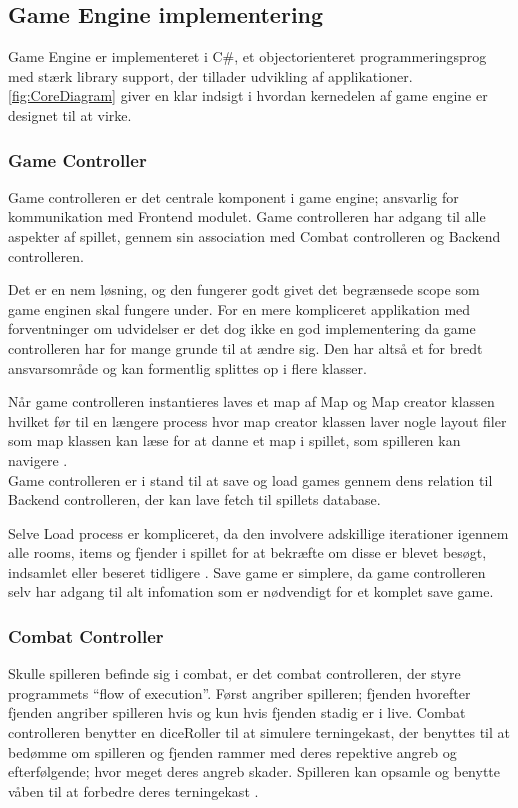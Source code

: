 \subsection{Game Engine implementering}
Game Engine er implementeret i C\#, et objectorienteret programmeringsprog
med stærk library support, der tillader udvikling af applikationer. 
\autoref{fig:CoreDiagram} giver en klar indsigt i hvordan kernedelen af
game engine er designet til at virke. 

\subsubsection{Game Controller}
Game controlleren er det centrale komponent i game engine; ansvarlig for 
kommunikation med Frontend modulet. Game controlleren har adgang til alle
aspekter af spillet, gennem sin association med Combat controlleren og 
Backend controlleren.

\noindent Det er en nem løsning, og den fungerer godt givet det begrænsede scope som 
game enginen skal fungere under.
For en mere kompliceret applikation med forventninger om udvidelser er det
dog ikke en god implementering da game controlleren har for mange grunde
til at ændre sig. Den har altså et for bredt ansvarsområde og kan formentlig
splittes op i flere klasser.

\noindent Når game controlleren instantieres laves et map af Map og Map creator klassen
hvilket før til en længere process hvor map creator klassen laver nogle
layout filer som map klassen kan læse for at danne et map i spillet, som 
spilleren kan navigere \parencite[Section 9.3.2][]{TekniskBilag}.\\

\noindent Game controlleren er i stand til at save og load games gennem 
dens relation til Backend controlleren, der kan lave fetch til spillets
database.

\noindent Selve Load process er kompliceret, da den involvere adskillige iterationer
igennem alle rooms, items og fjender i spillet for at bekræfte om disse er
blevet besøgt, indsamlet eller beseret tidligere \parencite[Section 9.3.1]
[Figure 55]{TekniskBilag}.
Save game er simplere, da game controlleren selv har adgang til alt infomation
som er nødvendigt for et komplet save game.

\subsubsection{Combat Controller}
Skulle spilleren befinde sig i combat, er det combat controlleren, der styre programmets
``flow of execution''. Først angriber spilleren; fjenden hvorefter fjenden angriber spilleren
hvis og kun hvis fjenden stadig er i live. Combat controlleren benytter en diceRoller til
at simulere terningekast, der benyttes til at bedømme om spilleren og fjenden rammer med
deres repektive angreb og efterfølgende; hvor meget deres angreb skader. Spilleren kan opsamle
og benytte våben til at forbedre deres terningekast \parencite[Section 8.3.2][]{TekniskBilag}. 

